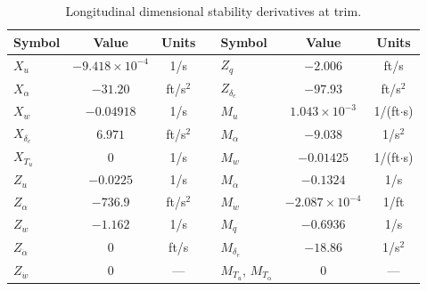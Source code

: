 \documentclass[11pt]{article}
\begin{document}
\begin{table}[h]\label{tab:table_3}
\centering
\caption{Longitudinal dimensional stability derivatives at trim.}
\begin{tabular}{lcc l lcc}
\toprule
\textbf{Symbol} & \textbf{Value} & \textbf{Units} & \quad &
\textbf{Symbol} & \textbf{Value} & \textbf{Units} \\
\midrule
$X_u$       & $-9.418\!\times\!10^{-4}$ & 1/s        & & $Z_q$       & $-2.006$                & ft/s        \\
$X_\alpha$  & $-31.20$                  & ft/s$^2$   & & $Z_{\delta_e}$ & $-97.93$            & ft/s$^2$    \\
$X_w$       & $-0.04918$                & 1/s        & & $M_u$       & $1.043\!\times\!10^{-3}$ & 1/(ft$\cdot$s) \\
$X_{\delta_e}$ & $6.971$                & ft/s$^2$   & & $M_\alpha$  & $-9.038$                & 1/s$^2$     \\
$X_{T_u}$   & $0$                       & 1/s        & & $M_w$       & $-0.01425$              & 1/(ft$\cdot$s) \\
$Z_u$       & $-0.0225$                 & 1/s        & & $M_{\dot\alpha}$ & $-0.1324$          & 1/s         \\
$Z_\alpha$  & $-736.9$                  & ft/s$^2$   & & $M_{\dot w}$ & $-2.087\!\times\!10^{-4}$ & 1/ft   \\
$Z_w$       & $-1.162$                  & 1/s        & & $M_q$       & $-0.6936$               & 1/s         \\
$Z_{\dot\alpha}$ & $0$                  & ft/s       & & $M_{\delta_e}$ & $-18.86$             & 1/s$^2$     \\
$Z_{\dot w}$ & $0$                      & ---        & & $M_{T_u}$, $M_{T_\alpha}$ & $0$         & ---         \\
\bottomrule
\end{tabular}
\end{table}
\end{document}
